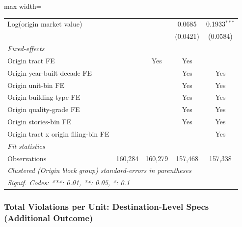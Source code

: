\documentclass[
  11pt,
]{article}
\begin{document}
\begin{adjustbox}{max width=\textwidth}
\begin{tabular}{lcccc}
   Log(origin market value)                       &          &          & 0.0685          & 0.1933$^{***}$\\   
                                                  &          &          & (0.0421)        & (0.0584)\\   
   \midrule
   \emph{Fixed-effects}\\
   Origin tract FE                                &          & Yes      & Yes             & \\  
   Origin year-built decade FE                    &          &          & Yes             & Yes\\  
   Origin unit-bin FE                             &          &          & Yes             & Yes\\  
   Origin building-type FE                        &          &          & Yes             & Yes\\  
   Origin quality-grade FE                        &          &          & Yes             & Yes\\  
   Origin stories-bin FE                          &          &          & Yes             & Yes\\  
   Origin tract x origin filing-bin FE            &          &          &                 & Yes\\  
   \midrule
   \emph{Fit statistics}\\
   Observations                                   & 160,284  & 160,279  & 157,468         & 157,338\\  
   \midrule \midrule
   \multicolumn{5}{l}{\emph{Clustered (Origin block group) standard-errors in parentheses}}\\
   \multicolumn{5}{l}{\emph{Signif. Codes: ***: 0.01, **: 0.05, *: 0.1}}\\
\end{tabular}
\par\endgroup

\end{adjustbox}

\subsubsection{Total Violations per Unit: Destination-Level Specs
(Additional
Outcome)}\label{total-violations-per-unit-destination-level-specs-additional-outcome}
\end{document}

